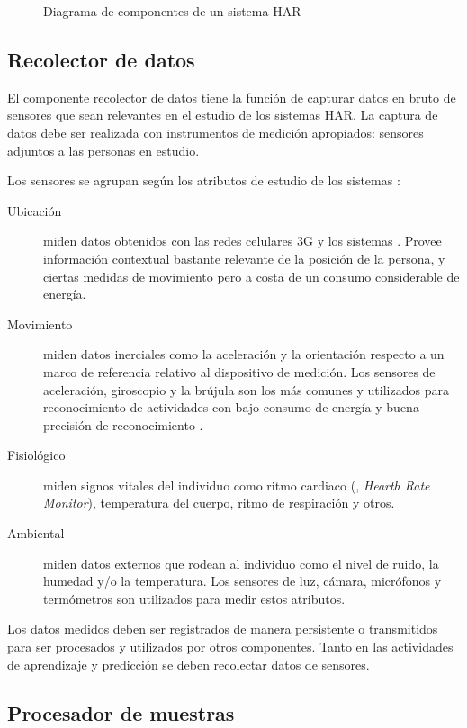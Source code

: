 \begin{figure}
\caption{Diagrama de componentes de un sistema HAR}

\end{figure}


\subsection{Recolector de datos}

El componente recolector de datos tiene la función de capturar datos
en bruto de sensores que sean relevantes en el estudio de los sistemas
\hyperlink{abbr}{HAR}. La captura de datos debe ser realizada con
instrumentos de medición apropiados: sensores adjuntos a las personas
en estudio. 

Los sensores se agrupan según los atributos de estudio de los sistemas
 \cite{LaraLabrador2013}:
\begin{description}
\item [{Ubicación}] miden datos obtenidos con las redes celulares 3G y
los sistemas . Provee información contextual bastante relevante
de la posición de la persona, y ciertas medidas de movimiento pero
a costa de un consumo considerable de energía.
\item [{Movimiento}] miden datos inerciales como la aceleración y la orientación
respecto a un marco de referencia relativo al dispositivo de medición.
Los sensores de aceleración, giroscopio y la brújula son los más comunes
y utilizados para reconocimiento de actividades con bajo consumo de
energía y buena precisión de reconocimiento \cite{Bao2004,LaraLabrador2012}.
\item [{Fisiológico}] miden signos vitales del individuo como ritmo cardiaco
(, \emph{Hearth Rate Monitor}), temperatura del cuerpo,
ritmo de respiración y otros.
\item [{Ambiental}] miden datos externos que rodean al individuo como el
nivel de ruido, la humedad y/o la temperatura. Los sensores de luz,
cámara, micrófonos y termómetros son utilizados para medir estos atributos. 
\end{description}
Los datos medidos deben ser registrados de manera persistente o transmitidos
para ser procesados y utilizados por otros componentes. Tanto en las
actividades de aprendizaje y predicción se deben recolectar datos
de sensores.

\subsection{Procesador de muestras}

